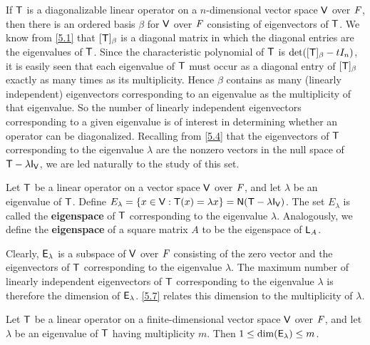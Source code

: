 \begin{note}
  If \(\mathsf{T}\) is a diagonalizable linear operator on a \(n\)-dimensional vector space \(\mathsf{V}\) over \(\mathit{F}\), then there is an ordered basis \(\beta\) for \(\mathsf{V}\) over \(\mathit{F}\) consisting of eigenvectors of \(\mathsf{T}\).
  We know from \cref{5.1} that \([\mathsf{T}]_{\beta}\) is a diagonal matrix in which the diagonal entries are the eigenvalues of \(\mathsf{T}\).
  Since the characteristic polynomial of \(\mathsf{T}\) is \(\det([\mathsf{T}]_{\beta} - t I_n)\), it is easily seen that each eigenvalue of \(\mathsf{T}\) must occur as a diagonal entry of \([\mathsf{T}]_{\beta}\) exactly as many times as its multiplicity.
  Hence \(\beta\) contains as many (linearly independent) eigenvectors corresponding to an eigenvalue as the multiplicity of that eigenvalue.
  So the number of linearly independent eigenvectors corresponding to a given eigenvalue is of interest in determining whether an operator can be diagonalized.
  Recalling from \cref{5.4} that the eigenvectors of \(\mathsf{T}\) corresponding to the eigenvalue \(\lambda\) are the nonzero vectors in the null space of \(\T - \lambda \IT[\V]\), we are led naturally to the study of this set.
\end{note}

\begin{defn}\label{5.2.4}
  Let \(\mathsf{T}\) be a linear operator on a vector space \(\mathsf{V}\) over \(\mathit{F}\), and let \(\lambda\) be an eigenvalue of \(\mathsf{T}\).
  Define \(E_\lambda = \set{x \in \V : \T(x) = \lambda x} = \ns{\T - \lambda \IT[\V]}\).
  The set \(E_\lambda\) is called the \textbf{eigenspace} of \(\mathsf{T}\) corresponding to the eigenvalue \(\lambda\).
  Analogously, we define the \textbf{eigenspace} of a square matrix \(A\) to be the eigenspace of \(\mathsf{L}_A\).
\end{defn}

\begin{note}
  Clearly, \(\mathsf{E}_{\lambda}\) is a subspace of \(\mathsf{V}\) over \(\mathit{F}\) consisting of the zero vector and the eigenvectors of \(\mathsf{T}\) corresponding to the eigenvalue \(\lambda\).
  The maximum number of linearly independent eigenvectors of \(\mathsf{T}\) corresponding to the eigenvalue \(\lambda\) is therefore the dimension of \(\mathsf{E}_{\lambda}\).
  \cref{5.7} relates this dimension to the multiplicity of \(\lambda\).
\end{note}

\begin{thm}\label{5.7}
  Let \(\mathsf{T}\) be a linear operator on a finite-dimensional vector space \(\mathsf{V}\) over \(\mathit{F}\), and let \(\lambda\) be an eigenvalue of \(\mathsf{T}\) having multiplicity \(m\).
  Then \(1 \leq \dim(\mathsf{E}_{\lambda}) \leq m\).
\end{thm}

